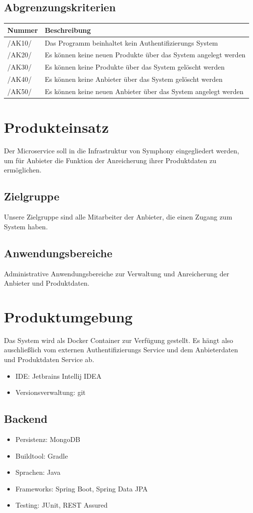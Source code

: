 \documentclass[a4paper,12pt]{article}
\newcommand\addrow[2]{#1 &#2\\ }
\newcommand\addheading[2]{#1 &#2\\ \hline}
\newcommand\tabularhead{\begin{tabular}{lp{13cm}}
\hline
}
\newenvironment{usecase}{\tabularhead}
{\hline\end{tabular}}
\begin{document}
\subsection{Abgrenzungskriterien}
\begin{usecase}
  \addheading{Nummer}{Beschreibung} 
  \addrow{/AK10/}{Das Programm beinhaltet kein Authentifizierungs System}
  \addrow{/AK20/}{Es können keine neuen Produkte über das System angelegt werden}
  \addrow{/AK30/}{Es können keine Produkte über das System gelöscht werden}
  \addrow{/AK40/}{Es können keine Anbieter über das System gelöscht werden}
  \addrow{/AK50/}{Es können keine neuen Anbieter über das System angelegt werden}
\end{usecase}

\clearpage

\section{Produkteinsatz}
Der Microservice soll in die Infrastruktur von Symphony eingegliedert werden, um für Anbieter die Funktion der Anreicherung ihrer Produktdaten zu ermöglichen.

\subsection{Zielgruppe}
Unsere Zielgruppe sind alle Mitarbeiter der Anbieter, die einen Zugang zum System haben.

\subsection{Anwendungsbereiche}
Administrative Anwendungsbereiche zur Verwaltung und Anreicherung der Anbieter und Produktdaten.

\section{Produktumgebung}
Das System wird als Docker Container zur Verfügung gestellt. Es hängt also auschließlich vom externen Authentifizierungs Service und dem Anbieterdaten und Produktdaten Service ab.

\begin{itemize}
\item
  IDE: Jetbrains Intellij IDEA
\item
  Versionsverwaltung: git
\end{itemize}

\subsection{Backend}
\begin{itemize}
\item
  Persistenz: MongoDB
\item
  Buildtool: Gradle
\item
  Sprachen: Java
\item
  Frameworks: Spring Boot, Spring Data JPA
\item
  Testing: JUnit, REST Assured
\end{itemize}
\end{document}
